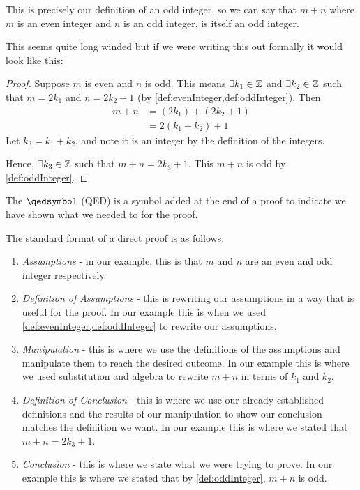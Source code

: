 This is precisely our definition of an odd integer, so we can say that $m + n$ where $m$ is an even integer and $n$ is an odd integer, is itself an odd integer.

This seems quite long winded but if we were writing this out formally it would look like this:
\newpage
\begin{proof}
    Suppose $m$ is even and $n$ is odd. This means $\exists k_1 \in \mathbb{Z}$ and $\exists k_2 \in \mathbb{Z}$ such that $m = 2k_1$ and $n = 2k_2 + 1$ (by \cref{def:evenInteger,def:oddInteger}). Then
    \begin{align*}
        m + n & = (2k_1) + (2k_2 + 1) \\
              & = 2(k_1 + k_2) + 1
    \end{align*}
    Let $k_3 = k_1 + k_2$, and note it is an integer by the definition of the integers.

    Hence, $\exists k_3 \in \mathbb{Z}$ such that $m + n = 2k_3 + 1$. This $m + n$ is odd by \cref{def:oddInteger}.
\end{proof}

The $\qedsymbol$ (QED) is a symbol added at the end of a proof to indicate we have shown what we needed to for the proof.

The standard format of a direct proof is as follows:
\begin{enumerate}
    \item \emph{Assumptions} - in our example, this is that $m$ and $n$ are an even and odd integer respectively.
    \item \emph{Definition of Assumptions} - this is rewriting our assumptions in a way that is useful for the proof. In our example this is when we used \cref{def:evenInteger,def:oddInteger} to rewrite our assumptions.
    \item \emph{Manipulation} - this is where we use the definitions of the assumptions and manipulate them to reach the desired outcome. In our example this is where we used substitution and algebra to rewrite $m + n$ in terms of $k_1$ and $k_2$.
    \item \emph{Definition of Conclusion} - this is where we use our already established definitions and the results of our manipulation to show our conclusion matches the definition we want. In our example this is where we stated that $m + n = 2k_3 + 1$.
    \item \emph{Conclusion} - this is where we state what we were trying to prove. In our example this is where we stated that by \cref{def:oddInteger}, $m + n$ is odd.
\end{enumerate}

